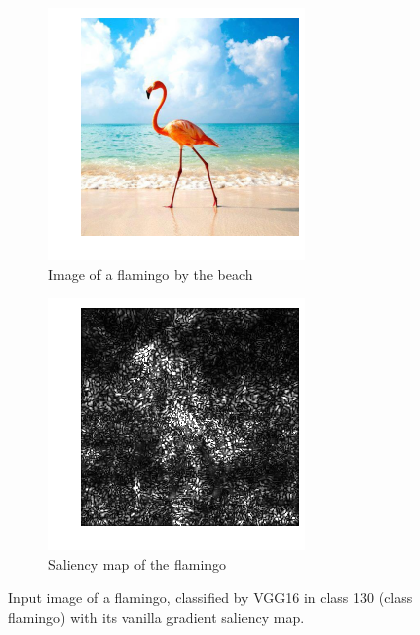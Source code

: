 \documentclass{article}
\begin{document}
    \begin{figure}[hbt!]
    	\centering
    	\hfil
    	\begin{subfigure}{.34\textwidth}
    		\includegraphics[width=\linewidth]{images/flamingo.png}
    		\caption*{Image of a flamingo by the beach}
    		\label{MLEDdet}
    	\end{subfigure}
    	\hfil
    	\begin{subfigure}{.34\textwidth}
    		\includegraphics[width=\linewidth]{images/flamingo_saliency.png}
    		\caption*{Saliency map of the flamingo}
    		\label{energydetPSK}
    	\end{subfigure}
        \hfil
        \label{fig:flamingo}
        \caption{Input image of a flamingo, classified by VGG16 in class 130 (class flamingo) with its vanilla gradient saliency map.}
    \end{figure} 
    
\end{document}
